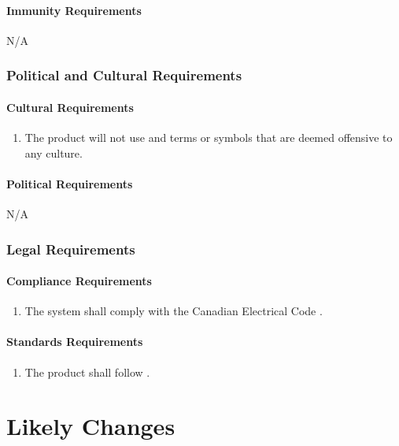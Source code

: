 \documentclass[12pt]{article}
\begin{document}
\paragraph{Immunity Requirements}
N/A



\subsubsection{Political and Cultural Requirements}
\label{NFR_PC}
\paragraph{Cultural Requirements}
\begin{enumerate}[{PC}1., leftmargin=2\parindent]
    \item The product will not use and terms or symbols that are deemed offensive to any culture.
\end{enumerate}

\paragraph{Political Requirements}
N/A



\subsubsection{Legal Requirements}
\label{NFR_Legal}
\paragraph{Compliance Requirements}
\begin{enumerate}[{LR}1., leftmargin=2\parindent]
    \item The system shall comply with the Canadian Electrical Code \cite{CanadianElectricalCode2021}.
\end{enumerate}

\paragraph{Standards Requirements}
\begin{enumerate}[{LR}1., leftmargin=2\parindent, resume]
    \item The product shall follow \cite{WCAG2018}.
\end{enumerate}


\section{Likely Changes}
\end{document}
